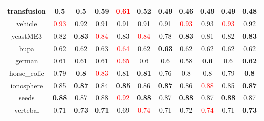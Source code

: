 \documentclass{article}%
\begin{document}
\begin{tabular}{c|cccccccccc}
\hline%
transfusion&0.5&0.5&0.59&\textcolor{red}{ 
0.61
}&\textbf{0.52}&0.49&0.46&\textbf{0.49}&\textbf{0.49}&0.48\\%
\hline%
vehicle&\textcolor{red}{ 
0.93
}&0.92&0.91&0.91&0.91&0.91&\textcolor{red}{ 
0.93
}&0.93&\textcolor{red}{ 
0.93
}&0.92\\%
\hline%
yeastME3&0.82&\textbf{0.83}&\textcolor{red}{ 
0.84
}&0.83&\textcolor{red}{ 
0.84
}&0.78&\textbf{0.83}&0.81&0.82&\textbf{0.83}\\%
\hline%
bupa&0.62&0.62&0.63&\textcolor{red}{ 
0.64
}&0.62&\textbf{0.63}&0.62&0.62&0.62&0.62\\%
\hline%
german&0.61&0.61&0.61&\textcolor{red}{ 
0.65
}&0.6&0.6&0.58&\textbf{0.6}&0.6&\textbf{0.62}\\%
\hline%
horse\_colic&0.79&\textbf{0.8}&\textcolor{red}{ 
0.83
}&0.81&\textbf{0.81}&0.76&0.8&0.8&0.79&\textbf{0.8}\\%
\hline%
ionosphere&0.85&\textbf{0.87}&0.84&\textbf{0.85}&0.86&\textbf{0.87}&0.86&\textcolor{red}{ 
0.88
}&0.85&\textbf{0.87}\\%
\hline%
seeds&\textbf{0.88}&0.87&0.88&\textcolor{red}{ 
0.92
}&\textbf{0.88}&0.87&\textbf{0.88}&0.87&\textbf{0.88}&0.87\\%
\hline%
vertebal&0.71&\textbf{0.73}&\textbf{0.71}&0.69&\textcolor{red}{ 
0.74
}&0.71&0.72&\textcolor{red}{ 
0.74
}&0.71&\textbf{0.73}\\%
\hline%
\end{tabular}

%
\end{document}
